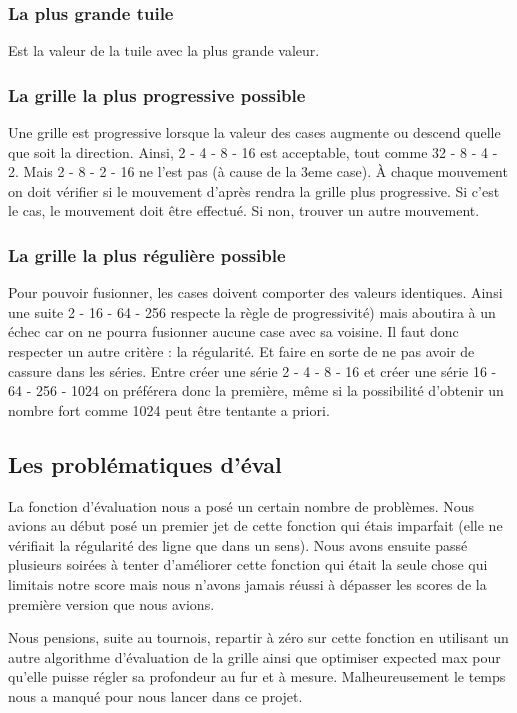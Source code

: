 \documentclass[12pt]{article}
\begin{document}
\subsubsection{La plus grande tuile} 
Est la valeur de la tuile avec la plus grande valeur.

\subsubsection{La grille la plus progressive possible}
Une grille est progressive lorsque la valeur des cases augmente ou descend
quelle que soit la direction. Ainsi, 2 - 4 - 8 - 16 est acceptable, tout comme
32 - 8 - 4 - 2. Mais 2 - 8 - 2 - 16 ne l'est pas (à cause de la 3eme case).
\`A chaque mouvement on doit vérifier si  le mouvement d'après rendra la
grille plus progressive. Si c'est le cas, le mouvement doit être effectué.
Si non, trouver un autre mouvement.

\subsubsection{La grille la plus régulière possible}
Pour pouvoir fusionner, les cases doivent comporter des valeurs identiques.
Ainsi une suite 2 - 16 - 64 - 256 respecte la règle de progressivité) mais
aboutira à un échec car on ne pourra fusionner aucune case avec sa voisine. Il
faut donc respecter un autre critère : la régularité. Et faire en sorte de
ne pas avoir de cassure dans les séries. Entre créer une série 2 - 4 - 8 -
16 et créer une série 16 - 64 - 256 - 1024 on préférera donc la
première, même si la possibilité d'obtenir un nombre fort comme 1024 peut
être tentante a priori.

\subsection{Les problématiques d'éval}
La fonction d'évaluation nous a posé un certain nombre de problèmes. Nous avions
au début posé un premier jet de cette fonction qui étais imparfait (elle ne vérifiait la régularité des ligne que
dans un sens). Nous avons ensuite passé plusieurs soirées à tenter d’améliorer
cette fonction qui était la seule chose qui limitais notre score mais nous n'avons
jamais réussi à dépasser les scores de la première version que nous avions.
\par Nous pensions, suite au tournois, repartir à zéro sur cette fonction
en utilisant un autre algorithme d'évaluation de la grille ainsi que optimiser
expected max pour qu'elle puisse régler sa profondeur au fur et à mesure. Malheureusement
le temps nous a manqué pour nous lancer dans ce projet.
\end{document}
